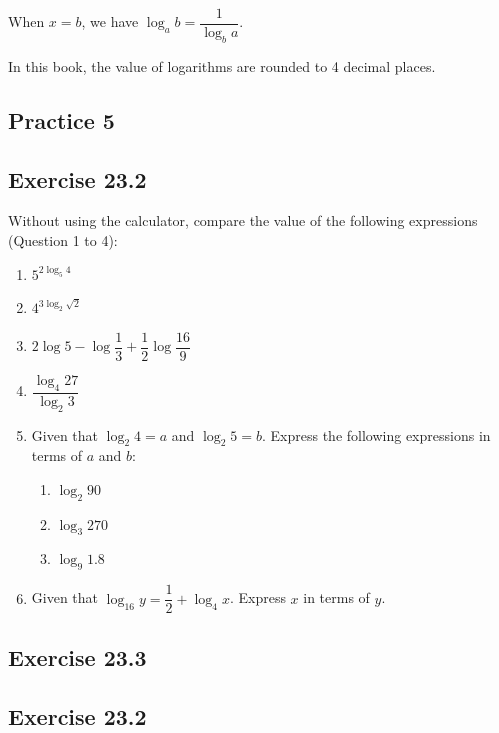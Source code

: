 \documentclass[12pt]{report}
\begin{document}
\noindent When $x = b$, we have $\log_a b = \dfrac{1}{\log_b a}$.

\noindent In this book, the value of logarithms are rounded to 4 decimal places.

\subsection*{Practice 5}

\subsection*{Exercise 23.2}

\setlength{\columnseprule}{1pt}
\setlength{\columnsep}{24pt}
\begin{multicols}{2}
  Without using the calculator, compare the value of the following expressions
  (Question 1 to 4):

  \begin{enumerate}
    \item $5^{2\log_5 4}$
    \item $4^{3\log_2 \sqrt{2}}$
    \item $2\log 5 - \log \dfrac{1}{3} + \dfrac{1}{2} \log\dfrac{16}{9}$
    \item $\dfrac{\log_4 27}{\log_2 3}$
    \item Given that $\log_2 4 = a$ and $\log_2 5 = b$. Express the following expressions
          in terms of $a$ and $b$:
          \begin{enumerate}
            \item $\log_2 90$
            \item $\log_3 270$
            \item $\log_9 1.8$
          \end{enumerate}

    \item Given that $\log_{16}y = \dfrac{1}{2} + \log_4 x$. Express $x$ in terms of $y$.
  \end{enumerate}
\end{multicols}

\subsection*{Exercise 23.3}

\subsection*{Exercise 23.2}
\end{document}
